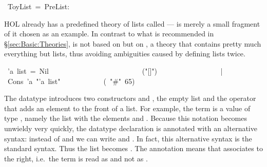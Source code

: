 \begin{isabelle}%
~ToyList~=~PreList:%
\begin{isamarkuptext}%
\noindent
HOL already has a predefined theory of lists called  ---
 is merely a small fragment of it chosen as an example. In
contrast to what is recommended in \S\ref{sec:Basic:Theories},
 is not based on  but on , a
theory that contains pretty much everything but lists, thus avoiding
ambiguities caused by defining lists twice.%
\end{isamarkuptext}%
~'a~list~=~Nil~~~~~~~~~~~~~~~~~~~~~~~~~~({"}[]{"})\isanewline
~~~~~~~~~~~~~~~~~|~Cons~'a~{"}'a~list{"}~~~~~~~~~~~~(~{"}\#{"}~65)%
\begin{isamarkuptext}%
\noindent
The datatype  introduces two
constructors  and , the
empty list and the operator that adds an element to the front of a list. For
example, the term  is a value of type
, namely the list with the elements  and
. Because this notation becomes unwieldy very quickly, the
datatype declaration is annotated with an alternative syntax: instead of
 and  we can write
\isa{[]} and
. In fact, this
alternative syntax is the standard syntax. Thus the list  becomes . The annotation
 means that \isa{\#} associates to
the right, i.e.\ the term  is read as  and not as .


\end{isamarkuptext}
\end{isabelle}
